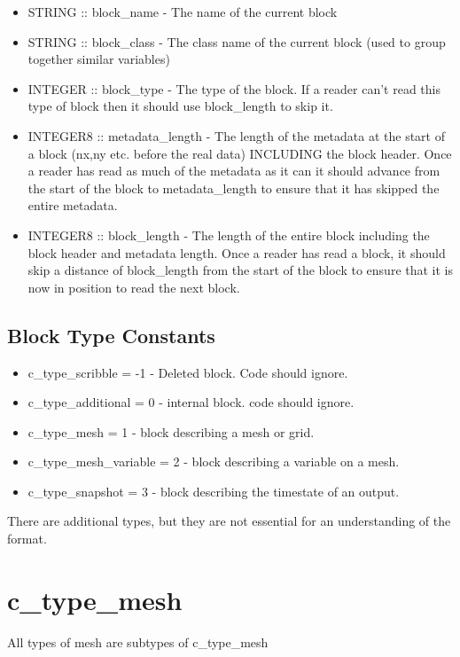 \documentclass[8pt]{article} \usepackage{url,graphicx,tabularx,array}
\begin{document}
\begin{itemize}
\item STRING :: block\_name - The name of the current block
\item STRING :: block\_class - The class name of the current block (used to
  group together similar variables)
\item INTEGER :: block\_type - The type of the block. If a reader can't read
  this type of block then it should use block\_length to skip it.
\item INTEGER8 :: metadata\_length - The length of the metadata at the start of
  a block (nx,ny etc. before the real data) INCLUDING the block header. Once a
  reader has read as much of the metadata as it can it should advance from the
  start of the block to metadata\_length to ensure that it has skipped the
  entire metadata.
\item INTEGER8 :: block\_length - The length of the entire block including the
  block header and metadata length. Once a reader has read a block, it should
  skip a distance of block\_length from the start of the block to ensure that
  it is now in position to read the next block.
\end{itemize}

\subsection{Block Type Constants}
\begin{itemize}
\item c\_type\_scribble = -1 - Deleted block. Code should ignore.
\item c\_type\_additional = 0 - internal block. code should ignore.
\item c\_type\_mesh = 1 - block describing a mesh or grid.
\item c\_type\_mesh\_variable = 2 - block describing a variable on a mesh.
\item c\_type\_snapshot = 3 - block describing the timestate of an output.
\end{itemize}

There are additional types, but they are not essential for an
understanding of the format.

\section{c\_type\_mesh}

All types of mesh are subtypes of c\_type\_mesh
\end{document}
